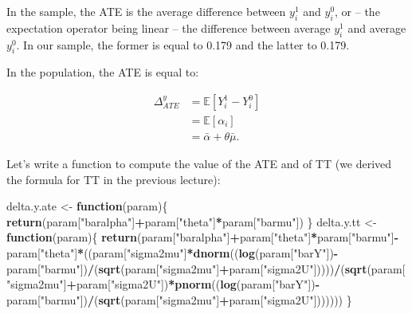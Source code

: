 \documentclass[]{book}
\newenvironment{Shaded}{\begin{snugshade}}{\end{snugshade}}
\newcommand{\KeywordTok}[1]{\textcolor[rgb]{0.13,0.29,0.53}{\textbf{#1}}}
\newcommand{\StringTok}[1]{\textcolor[rgb]{0.31,0.60,0.02}{#1}}
\newcommand{\ControlFlowTok}[1]{\textcolor[rgb]{0.13,0.29,0.53}{\textbf{#1}}}
\newcommand{\OperatorTok}[1]{\textcolor[rgb]{0.81,0.36,0.00}{\textbf{#1}}}
\newcommand{\NormalTok}[1]{#1}
\newcommand{\esp}[1]{\mathbb{E}[ #1 ]}
\theoremstyle{definition}
\theoremstyle{definition}
\theoremstyle{definition}
\theoremstyle{remark}
\begin{document}
In the sample, the ATE is the average difference between \(y_i^1\) and
\(y_i^0\), or -- the expectation operator being linear -- the difference
between average \(y_i^1\) and average \(y_i^0\). In our sample, the
former is equal to 0.179 and the latter to 0.179.

In the population, the ATE is equal to:

\begin{align*}
\Delta^y_{ATE} & = \esp{Y_i^1-Y_i^0} \\
              & = \esp{\alpha_i} \\
              & = \bar{\alpha}+\theta\bar{\mu}.
\end{align*}

Let's write a function to compute the value of the ATE and of TT (we
derived the formula for TT in the previous lecture):

\begin{Shaded}
\begin{Highlighting}[]
\NormalTok{delta.y.ate <-}\StringTok{ }\ControlFlowTok{function}\NormalTok{(param)\{}
  \KeywordTok{return}\NormalTok{(param[}\StringTok{"baralpha"}\NormalTok{]}\OperatorTok{+}\NormalTok{param[}\StringTok{"theta"}\NormalTok{]}\OperatorTok{*}\NormalTok{param[}\StringTok{"barmu"}\NormalTok{])}
\NormalTok{\}}
\NormalTok{delta.y.tt <-}\StringTok{ }\ControlFlowTok{function}\NormalTok{(param)\{}
  \KeywordTok{return}\NormalTok{(param[}\StringTok{"baralpha"}\NormalTok{]}\OperatorTok{+}\NormalTok{param[}\StringTok{"theta"}\NormalTok{]}\OperatorTok{*}\NormalTok{param[}\StringTok{"barmu"}\NormalTok{]}\OperatorTok{-}\NormalTok{param[}\StringTok{"theta"}\NormalTok{]}\OperatorTok{*}\NormalTok{((param[}\StringTok{"sigma2mu"}\NormalTok{]}\OperatorTok{*}\KeywordTok{dnorm}\NormalTok{((}\KeywordTok{log}\NormalTok{(param[}\StringTok{"barY"}\NormalTok{])}\OperatorTok{-}\NormalTok{param[}\StringTok{"barmu"}\NormalTok{])}\OperatorTok{/}\NormalTok{(}\KeywordTok{sqrt}\NormalTok{(param[}\StringTok{"sigma2mu"}\NormalTok{]}\OperatorTok{+}\NormalTok{param[}\StringTok{"sigma2U"}\NormalTok{]))))}\OperatorTok{/}\NormalTok{(}\KeywordTok{sqrt}\NormalTok{(param[}\StringTok{"sigma2mu"}\NormalTok{]}\OperatorTok{+}\NormalTok{param[}\StringTok{"sigma2U"}\NormalTok{])}\OperatorTok{*}\KeywordTok{pnorm}\NormalTok{((}\KeywordTok{log}\NormalTok{(param[}\StringTok{"barY"}\NormalTok{])}\OperatorTok{-}\NormalTok{param[}\StringTok{"barmu"}\NormalTok{])}\OperatorTok{/}\NormalTok{(}\KeywordTok{sqrt}\NormalTok{(param[}\StringTok{"sigma2mu"}\NormalTok{]}\OperatorTok{+}\NormalTok{param[}\StringTok{"sigma2U"}\NormalTok{]))))))}
\NormalTok{\}}
\end{Highlighting}
\end{Shaded}
\end{document}
